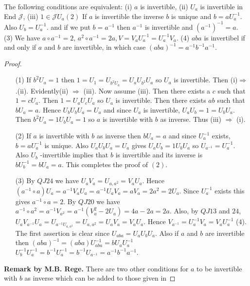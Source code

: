 \begin{thminv}
  The following conditions are equivalent: (i) $a$ is invertible, (ii)
  $U_a$ is invertible in End $\mathscr{J}$, (iii) $1\in
  \mathscr{J}U_a(2)$ If $a$ is invertible the inverse $b$ is unique and
  $b=aU_a^{-1}$. Also $U_b=U_a^{-1}$. \qquad and if we put $b=a^{-1}$
  then $a^{-1}$ is invertible and $(a^{-1})^{-1}=a$. (3) We have $a\circ
  a^{-1}=2$, $a^{2}\circ a^{-1}=2a, V=V_aU^{-1}_a=U_{a}^{-1}V_a$. (4)
  $aba$ is invertibel if and only if $a$ and $b$ are invertible, in
  which case $(aba)^{-1}=a^{-1}b^{-1}a^{-1}$.
\end{thminv}

\begin{proof}\pageoriginale
\begin{itemize}
\item[(1)] If $b^{2}U_a=1$ then $1=U_1=U_{b^{2}U_a}=U_aU_{b^{2}}U_a$
 so $U_a$ is invertible. Then
  (i)$\Rightarrow$.(ii). Evidently(ii) $\Rightarrow$ (iii). Now assume
  (iii). Then there exists a $c$ such that $1=cU_{a}$. Then
  $1=U_{a}U_{c}U_{a}$ so $U_{a}$ is invertible. Then there exists $ab$
  such that $bU_a=a$. Hence $U_bU_bU_a=U_a$ and since $U_a$ is
  invertible, $U_aU_b=1=U_bU_a$. Then $b^{2}U_a=1U_bU_a=1$ so $a$ is
  invertible with $b$ as inverse. Thus (iii) $\Rightarrow$ (i).

\item[(2)] If $a$ is invertible with $b$ as inverse then $bU_a=a$ and
  since $U_a^{-1}$ exists, $b=aU_a^{-1}$ is unique. Also
  $U_aU_bU_a=U_a$ gives $U_aU_b=1U_bU_a$ so
  $U_{a^{-1}}=U^{-1}_a$. Also $U_b$ -invertible implies that $b$ is
  invertible and its inverse is $bU_b^{-1}=bU_a=a$. This completes the
  proof of $(2)$.

\item[(3)] By $QJ24$ we have $U_aV_a=U_{a,a^{2}}=V_aU_a$. Hence
 $(a^{-1}\circ
  a)U_a=a^{-1}V_aU_a=a^{-1}U_aV_a=aV_a=2a^{2}=2U_a$. Since $U^{-1}_a$  
  exists this gives $a^{-1}\circ a=2$. By $QJ20$ we have $a^{-1}\circ
  a^{2}=a^{-1}V_{a^{2}}=a^{-1}(V^{2}_a-2U_a)=4a-2a=2a$. Also, by
  $QJ13$ and $24$,
  $U_aV_{a^{-1}}U_a=U_{a^{-1}U_{a,a^{2}}}=U_{a,a^{2}}=U_aV_a=V_aU_a$. Hence
    $V_{a^{-1}}=U_a^{-1}V_{a}=V_aU^{-1}_a$ (4). The first assertion is
      clear since $U_{aba}=U_aU_bU_a$. Also if $a$ and $b$ are
      invertible then
      $(aba)^{-1}=(aba)U^{-1}_{aba}=bU_aU^{-1}_a$ $U^{-1}_bU^{-1}_a =
      b^{-1}U^{-1}_a = b^{-1}U_{a^{-1}}=a^{-1}b^{-1}a^{-1}$. 
\end{itemize}

\noindent
{\textbf{Remark by M.B. Rege.}}
There are two other conditions for $a$ to be invertible with $b$ as
inverse which can  be added to those given in 


\end{proof}
